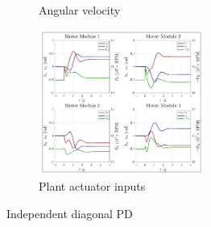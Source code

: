 \begin{figure}[htbp]
\begin{subfigure}{0.49\textwidth}
\vspace{-20pt}
\caption{Angular velocity}
\label{fig:PD_Diagonal_Independent_Angular}
\end{subfigure}
\begin{subfigure}{\textwidth}
\centering
\includegraphics[width=0.6\textwidth]{graphs/PD_Diagonal_Independent_Input}
\vspace{-8pt}
\caption{Plant actuator inputs}
\label{fig:PD_Diagonal_Independent_Input}
\end{subfigure}
\vspace{-8pt}
\caption{Independent diagonal PD}
\vspace{-26pt}
\end{figure}
